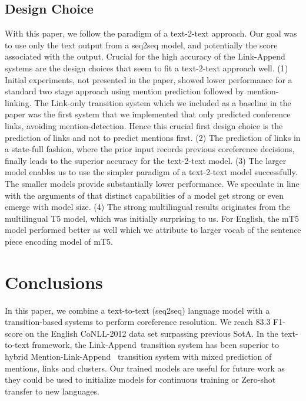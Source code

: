 \documentclass[11pt,a4paper]{article}
\newcommand{\LA}{Link-Append}
\newcommand{\M}{Mention-Link-Append}
\begin{document}
\subsection{Design Choice}

With this paper, we follow the paradigm of a text-2-text approach. Our goal was to use only the text output from a seq2seq model, and potentially the score associated with the output. Crucial for the high accuracy of the Link-Append systems are the design choices that seem to fit a text-2-text approach well.
(1) Initial experiments, not presented in the paper, showed lower performance for a standard two stage approach using mention prediction followed by mention-linking. The Link-only transition system which we included as a baseline in the paper was the first  system that we implemented that only predicted conference links, avoiding mention-detection. Hence this crucial first design choice is the  prediction of links and not to predict mentions first. (2) The prediction of links in a state-full fashion, where the prior input records previous coreference decisions, finally leads to the superior accuracy for the text-2-text model. 
(3) The larger model enables us to use the simpler paradigm of a text-2-text model successfully. The smaller models provide  substantially lower performance. We speculate in line with the arguments of  that distinct capabilities of a model get strong or even emerge with  model size. 
(4) The strong multilingual results originates from the multilingual T5 model, which was initially surprising to us. For English, the mT5 model performed better as well which we attribute to larger vocab of the sentence piece encoding model of mT5. 


\section{Conclusions}

In this paper, we combine a text-to-text (seq2seq) language model with a transition-based systems to perform coreference resolution. We reach 83.3 F1-score on the English CoNLL-2012 data set surpassing previous SotA. 
In the text-to-text framework, the \LA~transition system has been superior to hybrid \M~ transition system with mixed prediction of mentions, links and clusters. 
Our trained models are useful for future work as they could be used to initialize models for continuous training  or Zero-shot transfer to new languages. 
\end{document}
